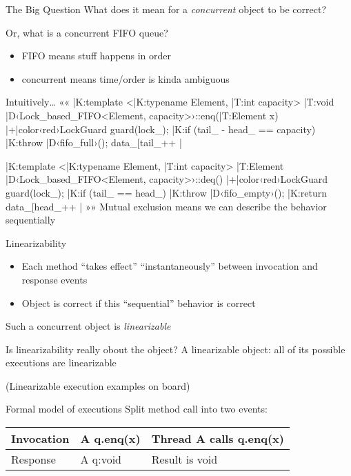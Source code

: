 \documentclass{beamer}
\begin{document}
\begin{frame}{The Big Question}{}
  What does it \alert{mean} for a \emph{concurrent} object to be
  correct?
  \par\smallskip
  \pause
  Or, what \alert{is} a concurrent FIFO queue?
  \pause
  \begin{itemize}
    \item FIFO means stuff happens in order
    \item concurrent means time/order is kinda ambiguous
  \end{itemize}
\end{frame}

\begin{frame}[fragile]{Intuitively\ldots}{}
  ««
  |K:template <|K:typename Element, |T:int capacity>
  |T:void |D‹Lock_based_FIFO<Element, capacity>›::enq(|T:Element x) {
  	|+|color‹red›LockGuard guard(lock_);
    |K:if (tail_ - head_ == capacity) |K:throw |D‹fifo_full›();
    data_[tail_++ |%
  }

  |K:template <|K:typename Element, |T:int capacity>
  |T:Element |D‹Lock_based_FIFO<Element, capacity>›::deq() {
  	|+|color‹red›LockGuard guard(lock_);
    |K:if (tail_ == head_) |K:throw |D‹fifo_empty›();
    |K:return data_[head_++ |%
  }
  »»
  \pause
  Mutual exclusion means we can describe the behavior sequentially
\end{frame}

\begin{frame}{Linearizability}{}
  \begin{itemize}
    \item Each method “takes effect” “instantaneously” between invocation
      and response events
    \item Object is correct if this “sequential” behavior is correct
  \end{itemize}
  \pause
  Such a concurrent object is \emph{linearizable}
\end{frame}

\begin{frame}{Is linearizability really obout the object?}{}
  A linearizable object: all of its possible \alert{executions} are
  linearizable

  {\small (Linearizable execution examples on board)}
\end{frame}

\begin{frame}{Formal model of executions}{}
  Split method call into two events:
  \begin{center}
    \begin{tabular}{|l|l|l|}
      \hline
      Invocation & A q.enq(x) & Thread A calls q.enq(x) \\
      \hline
      Response & A q:void & Result is void \\
      \hline
    \end{tabular}
  \end{center}
\end{frame}
\end{document}
